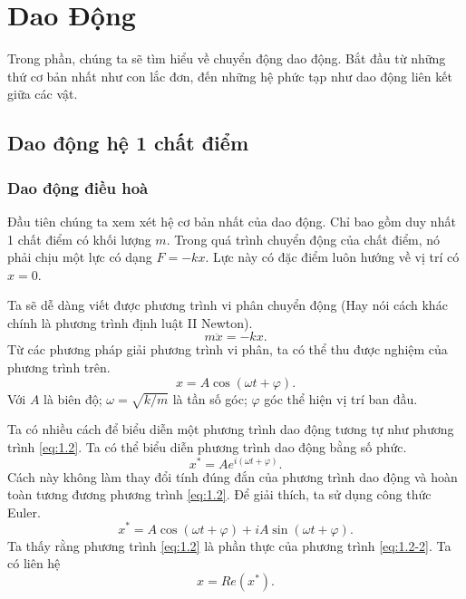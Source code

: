   
\chapter{Dao Động}

Trong phần, chúng ta sẽ tìm hiểu về chuyển động dao động. Bắt đầu từ những thứ cơ bản nhất như con lắc đơn, đến những hệ phức tạp như dao động liên kết giữa các vật. 




\section{Dao động hệ 1 chất điểm}
\subsection{Dao động điều hoà}
Đầu tiên chúng ta xem xét hệ cơ bản nhất của dao động. Chỉ bao gồm duy nhất 1 chất điểm có khối lượng \(m\). Trong quá trình chuyển động của chất điểm, nó phải chịu một lực có dạng \(F = - k x\). Lực này có đặc điểm luôn hướng về vị trí có \(x = 0\). 

\begin{figure}[!htb]
    \centering
    
    \caption{}
    \label{fig:1.1}
\end{figure}

Ta sẽ dễ dàng viết được phương trình vi phân chuyển động (Hay nói cách khác chính là phương trình định luật II Newton).
\begin{equation}
    m \ddot{x} = -kx.
    \label{eq:1.1}
\end{equation}
Từ các phương pháp giải phương trình vi phân, ta có thể thu được nghiệm của phương trình trên.
\begin{equation}
    x = A \cos{ \left(\omega t + \varphi \right)}.
    \label{eq:1.2}
\end{equation}
Với \(A\) là biên độ; \(\omega = \sqrt{k/m}\) là tần số góc; \(\varphi\) góc thể hiện vị trí ban đầu. 
\vspace{4mm}

Ta có nhiều cách để biểu diễn một phương trình dao động tương tự như phương trình \ref{eq:1.2}. Ta có thể biểu diễn phương trình dao động bằng số phức.
\begin{equation}
    x^* = A e^{i \left( \omega t + \varphi \right)}.
    \label{eq:1.2-2}
\end{equation}
Cách này không làm thay đổi tính đúng đắn của phương trình dao động và hoàn toàn tương đương phương trình \ref{eq:1.2}. Để giải thích, ta sử dụng công thức Euler.
\begin{equation*}
    x^* = A \cos{\left( \omega t + \varphi \right)} + i A \sin{\left( \omega t + \varphi \right)}.
\end{equation*}
Ta thấy rằng phương trình \ref{eq:1.2} là phần thực của phương trình \ref{eq:1.2-2}. Ta có liên hệ
\begin{equation}
    x = Re (x^*).
\end{equation}
